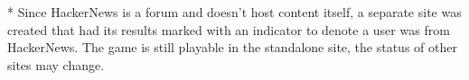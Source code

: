 \documentclass[letterpaper,man,natbib,floatsintext]{apa7}  %
\begin{document}
\noindent
* Since HackerNews is a forum and doesn't host content itself, a separate site was created that had its 
results marked with an indicator to denote a user was from HackerNews. The game is still playable in the standalone site, the status of other sites may change.


\end{document}
